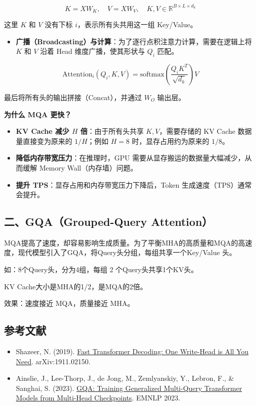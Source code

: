 \[
K = XW_K, \quad V = XW_V, \quad K,V \in \mathbb{R}^{B \times L \times d_k}
\]

这里 \(K\) 和 \(V\) 没有下标 \(i\)，表示所有头共用这一组 Key/Value。

\begin{itemize}
\tightlist
\item
  \textbf{广播（Broadcasting）与计算}：为了逐行点积注意力计算，需要在逻辑上将 \(K\) 和 \(V\) 沿着 Head 维度广播，使其形状与 \(Q_i\) 匹配。
\end{itemize}

\[
\mathrm{Attention}_i(Q_i,K,V)=\mathrm{softmax}\left(\frac{Q_iK^T}{\sqrt{d_k}}\right)V
\]

最后将所有头的输出拼接（Concat），并通过 \(W_O\) 输出层。

\textbf{为什么 MQA 更快？}

\begin{itemize}
\tightlist
\item
  \textbf{KV Cache 减少 \(H\) 倍}：由于所有头共享 \(K,V\)，需要存储的 KV Cache 数据量直接变为原来的 \(1/H\)；例如 \(H=8\) 时，显存占用约为原来的 \(1/8\)。
\item
  \textbf{降低内存带宽压力}：在推理时，GPU 需要从显存搬运的数据量大幅减少，从而缓解 Memory Wall（内存墙）问题。
\item
  \textbf{提升 TPS}：显存占用和内存带宽压力下降后，Token 生成速度（TPS）通常会提升。
\end{itemize}

\hypertarget{ux4e8cgqagrouped-query-attention}{%
\subsection{二、GQA（Grouped-Query Attention）}\label{ux4e8cgqagrouped-query-attention}}

MQA提高了速度，却容易影响生成质量。为了平衡MHA的高质量和MQA的高速度，现代模型引入了GQA，将Query头分组，每组共享一个Key/Value 头。

如：8个Query头，分为4组，每组 2 个Query头共享1个KV头。

KV Cache大小是MHA的1/2，是MQA的2倍。

效果：速度接近 MQA，质量接近 MHA。

\FloatBarrier
{}
\hypertarget{ux53c2ux8003ux6587ux732e-94}{%
\subsection{参考文献}\label{ux53c2ux8003ux6587ux732e-94}}

\vspace{0.25em}
\begin{itemize}
\tightlist
\item
  Shazeer, N. (2019). \href{https://arxiv.org/abs/1911.02150}{Fast Transformer Decoding: One Write-Head is All You Need}. arXiv:1911.02150.
\item
  Ainslie, J., Lee-Thorp, J., de Jong, M., Zemlyanskiy, Y., Lebron, F., \& Sanghai, S. (2023). \href{https://arxiv.org/abs/2305.13245}{GQA: Training Generalized Multi-Query Transformer Models from Multi-Head Checkpoints}. EMNLP 2023.
\end{itemize}

\clearpage
